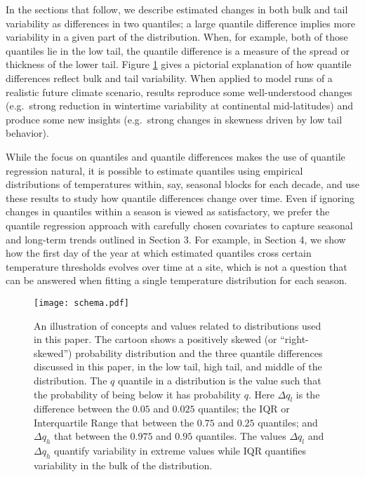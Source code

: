 \documentclass{ametsoc}
\newcommand\smallfigwidth{\columnwidth}
\begin{document}
 In the sections that follow, we describe estimated changes in both bulk and tail variability as differences in two quantiles; a large quantile difference implies more variability in a given part of the distribution. 
When, for example, both of those quantiles lie in the low tail, the quantile difference is a measure of the spread or thickness of the lower tail.
 Figure \ref{schema} gives a pictorial explanation of how quantile differences reflect bulk and tail variability.
When applied to model runs of a realistic future climate scenario, results reproduce some well-understood changes (e.g.\ strong reduction in wintertime variability at continental mid-latitudes) and produce some new insights (e.g.\ strong changes in skewness driven by low tail behavior). 

{While the focus on quantiles and quantile differences makes the use of quantile regression natural, it is possible to estimate quantiles using empirical distributions of temperatures within, say, seasonal blocks for each decade, and use these results to study how quantile differences change over time.  Even if ignoring changes in quantiles within a season is viewed as satisfactory, we prefer the quantile regression approach with carefully chosen covariates to capture seasonal and long-term trends outlined in Section 3.  For example, in Section 4, we show how the first day of the year at which estimated quantiles cross certain temperature thresholds evolves over time at a site, which is not a question that can be answered when fitting a single temperature distribution for each season.}


\begin{figure} 
\texttt{[image: schema.pdf]}
\caption{\small{An illustration of concepts and values related to distributions used in this paper. The cartoon shows a positively skewed (or ``right-skewed'') probability distribution and the three quantile differences discussed in this paper, in the low tail, high tail, and middle of the distribution. 
The $q$ quantile in a distribution is the value such that the probability of being below it has probability $q$. Here $\Delta q_{l}$ is the difference between the $0.05$ and $0.025$ quantiles; the IQR or Interquartile Range that between the $0.75$ and $0.25$ quantiles; and $\Delta q_{h}$ that between the $0.975$ and $0.95$ quantiles. The values $\Delta q_{l}$ and $\Delta q_{h}$ quantify variability in extreme values while IQR quantifies variability in the bulk of the distribution.
}}            %
\label{schema}          %
\end{figure}
\end{document}
